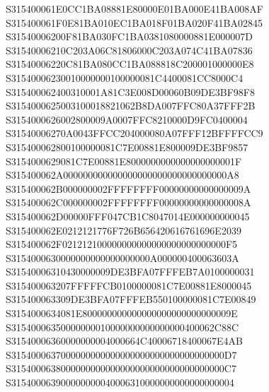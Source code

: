 \documentclass[12pt,a4paper]{article}
\begin{document}
\begin{framed}
{S315400061E0CC1BA08881E80000E01BA000E41BA008AF\newline
S315400061F0E81BA010EC1BA018F01BA020F41BA02845\newline
S31540006200F81BA030FC1BA0381080000881E000007D\newline
S31540006210C203A06C81806000C203A074C41BA07836\newline
S31540006220C81BA080CC1BA088818C200001000000E8\newline
S31540006230010000000100000081C4400081CC8000C4\newline
S315400062400310001A81C3E008D00060B09DE3BF98F8\newline
S3154000625003100018821062B8DA007FFC80A37FFF2B\newline
S3154000626002800009A0007FFC8210000D9FC0400004\newline
S31540006270A0043FFCC204000080A07FFF12BFFFFCC9\newline
S315400062800100000081C7E00881E800009DE3BF9857\newline
S3154000629081C7E00881E8000000000000000000001F\newline
S315400062A000000000000000000000000000000000A8\newline
S315400062B000000002FFFFFFFF00000000000000009A\newline
S315400062C000000002FFFFFFFF00000000000000008A\newline
S315400062D00000FFF047CB1C8047014E000000000045\newline
S315400062E0212121776F726B656420616761696E2039\newline
S315400062F021212100000000000000000000000000F5\newline
S3154000630000000000000000000A000000400063603A\newline
S31540006310430000009DE3BFA07FFFEB7A0100000031\newline
S315400063207FFFFFCB0100000081C7E00881E8000045\newline
S315400063309DE3BFA07FFFEB550100000081C7E00849\newline
S3154000634081E800000000000000000000000000009E\newline
S31540006350000000010000000000000000400062C88C\newline
S31540006360000000004000664C40006718400067E4AB\newline
S3154000637000000000000000000000000000000000D7\newline
S3154000638000000000000000000000000000000000C7\newline
S315400063900000000040006310000000000000000004\newline
}
\end{framed}
\end{document}
